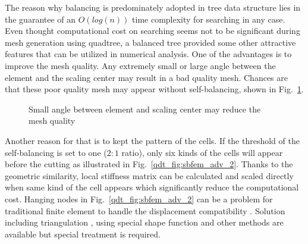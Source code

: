 The reason why balancing is predominately adopted in tree data structure lies in the guarantee of an $O\left(log(n)\right)$ time complexity for searching in any case.
Even thought computational cost on searching seems not to be significant during mesh generation using quadtree, a balanced tree provided some other attractive features that can be utilized in numerical analysis.
One of the advantages is to improve the mesh quality.
Any extremely small or large angle between the element and the scaling center may result in a bad quality mesh.
Chances are that these poor quality mesh may appear without self-balancing, shown in Fig.~\ref{qdt_fig:sbfem_adv_1}.
    \begin{figure}[h!]
        \centering
        \caption{Small angle between element and scaling center may reduce the mesh quality}
        \label{qdt_fig:sbfem_adv_1}
    \end{figure}
%
Another reason for that is to kept the pattern of the cells.
If the threshold of the self-balancing is set to one ($2:1$ ratio), only six kinds of the cells will appear before the cutting as illustrated in Fig.~\ref{qdt_fig:sbfem_adv_2}.
Thanks to the geometric similarity, local stiffness matrix can be calculated and scaled directly when same kind of the cell appears which significantly reduce the computational cost.
Hanging nodes in Fig.~\ref{qdt_fig:sbfem_adv_2} can be a problem for traditional finite element to handle the displacement compatibility \citep{Tabarraei:2009:XFE,NME:NME3070,NME:NME2900}.
Solution including triangulation \citep{4037344,BERN1994384,ijeas251083}, using special shape function \citep{NME:NME1620120104} and other methods are available but special treatment is required.
